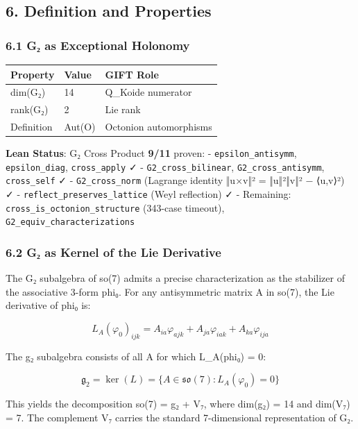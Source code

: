 \documentclass[11pt,a4paper]{article}
\begin{document}
{{{{{{{{{\subsection{6. Definition and Properties}\label{definition-and-properties}

\subsubsection{6.1 G₂ as Exceptional Holonomy}\label{gux2082-as-exceptional-holonomy}

{\def\LTcaptype{none} %
\begin{longtable}[]{@{}lll@{}}
\toprule\noalign{}
Property & Value & GIFT Role \\
\midrule\noalign{}
\endhead
\bottomrule\noalign{}
\endlastfoot
dim(G₂) & 14 & Q\_Koide numerator \\
rank(G₂) & 2 & Lie rank \\
Definition & Aut(O) & Octonion automorphisms \\
\end{longtable}
\textbf{Lean Status}: G₂ Cross Product \textbf{9/11} proven:
- \texttt{epsilon\_antisymm}, \texttt{epsilon\_diag}, \texttt{cross\_apply} ✓
- \texttt{G2\_cross\_bilinear}, \texttt{G2\_cross\_antisymm}, \texttt{cross\_self} ✓
- \texttt{G2\_cross\_norm} (Lagrange identity ‖u×v‖² = ‖u‖²‖v‖² − ⟨u,v⟩²) ✓
- \texttt{reflect\_preserves\_lattice} (Weyl reflection) ✓
- Remaining: \texttt{cross\_is\_octonion\_structure} (343-case timeout), \texttt{G2\_equiv\_characterizations}

\subsubsection{6.2 G₂ as Kernel of the Lie Derivative}\label{gux2082-as-kernel-of-the-lie-derivative}

The G₂ subalgebra of so(7) admits a precise characterization as the stabilizer of the associative 3-form phi₀. For any antisymmetric matrix A in so(7), the Lie derivative of phi₀ is:

\[L_A(\varphi_0)_{ijk} = A_{ia}\varphi_{ajk} + A_{ja}\varphi_{iak} + A_{ka}\varphi_{ija}\]

The g₂ subalgebra consists of all A for which L\_A(phi₀) = 0:

\[\mathfrak{g}_2 = \ker(L) = \{A \in \mathfrak{so}(7) : L_A(\varphi_0) = 0\}\]

This yields the decomposition so(7) = g₂ + V₇, where dim(g₂) = 14 and dim(V₇) = 7. The complement V₇ carries the standard 7-dimensional representation of G₂.

}}}}}}}}}}
\end{document}
